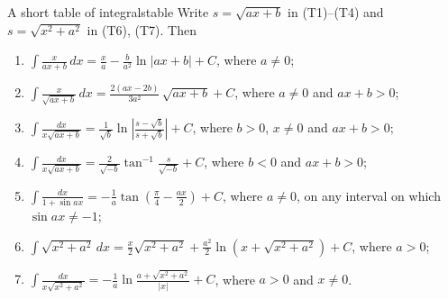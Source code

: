 \documentclass[11pt]{article}
\begin{document}
\begin{thm}{A short table of integrals}{table}
Write $s=\sqrt{ax+b}$ in (T1)--(T4) and $s=\sqrt{x^2+a^2}$ in (T6), (T7). Then
\begin{enumerate}[label=(T\arabic*),leftmargin=*]
  \item $\displaystyle\int\frac{x}{ax+b}\,dx=\frac xa-\frac b{a^2}\ln\lvert ax+b\rvert+C$, where $a\ne0$;
  \item $\displaystyle\int\frac{x}{\sqrt{ax+b}}\,dx=\frac{2(ax-2b)}{3a^2}\,\sqrt{ax+b}+C$, where $a\ne0$ and $ax+b>0$;
  \item $\displaystyle\int\frac{dx}{x\sqrt{ax+b}}=\frac1{\sqrt b}\ln\left\lvert\frac{s-\sqrt b}{s+\sqrt b}\right\rvert+C$, where $b>0$, $x\ne0$ and $ax+b>0$;
  \item $\displaystyle\int\frac{dx}{x\sqrt{ax+b}}=\frac2{\sqrt{-b}}\tan^{-1}\frac{s}{\sqrt{-b}}+C$, where $b<0$ and $ax+b>0$;
  \item $\displaystyle\int\frac{dx}{1+\sin ax}=-\frac1a\tan\left(\frac\pi4-\frac{ax}2\right)+C$, where $a\ne0$, on any interval on which $\sin ax\ne-1$;
  \item $\displaystyle\int\sqrt{x^2+a^2}\,dx=\frac x2\sqrt{x^2+a^2}+\frac{a^2}2\ln\left(x+\sqrt{x^2+a^2}\right)+C$, where $a>0$;
  \item $\displaystyle\int\frac{dx}{x\sqrt{x^2+a^2}}=-\frac1a\ln\frac{a+\sqrt{x^2+a^2}}{\lvert x\rvert}+C$, where $a>0$ and $x\ne0$.
\end{enumerate}
\end{thm}
\end{document}
